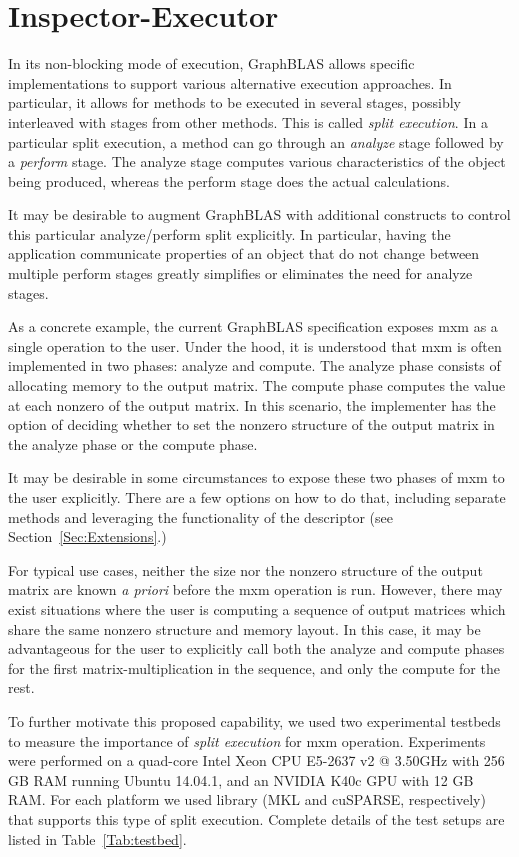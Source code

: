 \section{Inspector-Executor}

In its non-blocking mode of execution, GraphBLAS allows specific
implementations to support various alternative execution approaches. In
particular, it allows for methods to be executed in
several stages, possibly interleaved with stages from other methods. This
is called \emph{split execution}. In a particular split execution, a
method can go through an \emph{analyze} stage followed by a \emph{perform}
stage.  The analyze stage computes various characteristics of the object
being produced, whereas the perform stage does the actual calculations.

It may be desirable to augment GraphBLAS with additional constructs to
control this particular analyze/perform split explicitly. In particular,
having the application communicate properties of an object that do not
change between multiple perform stages greatly simplifies
or eliminates the need for analyze stages.

As a concrete example, the current GraphBLAS specification exposes {\sf
mxm} as a single operation to the user. Under the hood, it is understood
that {\sf mxm} is often implemented in two phases: analyze and
compute. The analyze phase consists of allocating memory to the output
matrix. The compute phase computes the value at each nonzero of the
output matrix. In this scenario, the implementer has the option of deciding whether to
set the nonzero structure of the output matrix in the analyze phase or
the compute phase.

It may be desirable in some circumstances to expose these two phases of
{\sf mxm} to the user explicitly. There are a few options on how to do that, 
including separate methods and leveraging the functionality of the descriptor 
(see Section~\ref{Sec:Extensions}.)

For typical use cases, neither the size nor the nonzero structure of the output
matrix are known \emph{a priori} before the {\sf mxm}
operation is run. However, there may exist situations where the user is
computing a sequence of output matrices which share
the same nonzero structure and memory layout. In this case, it may be advantageous 
for the user to explicitly call both the analyze and compute phases 
for the first matrix-multiplication
in the sequence, and only the compute for the rest.

To further motivate this proposed capability, we used two experimental 
testbeds to measure the importance of \emph{split
execution} for {\sf mxm} operation. Experiments were performed on a
quad-core Intel Xeon CPU E5-2637 v2 @ 3.50GHz with 256 GB RAM running
Ubuntu 14.04.1, and an NVIDIA K40c GPU with 12 GB RAM. For each platform we used
library (MKL and cuSPARSE, respectively) that supports this type of split 
execution. Complete details of the test setups are listed in Table~\ref{Tab:testbed}.

